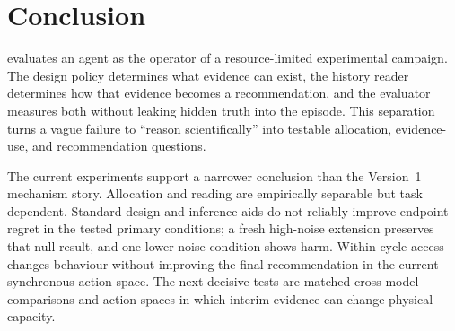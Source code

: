 \section{Conclusion}
\label{sec:conclusion}

\slowlab{} evaluates an agent as the operator of a resource-limited experimental campaign.
The design policy determines what evidence can exist, the history reader determines how that
evidence becomes a recommendation, and the evaluator measures both without leaking hidden
truth into the episode. This separation turns a vague failure to ``reason scientifically''
into testable allocation, evidence-use, and recommendation questions.

The current experiments support a narrower conclusion than the Version~1 mechanism story.
Allocation and reading are empirically separable but task dependent. Standard design and
inference aids do not reliably improve endpoint regret in the tested primary conditions; a
fresh high-noise extension preserves that null result, and one lower-noise condition shows
harm. Within-cycle access changes behaviour without improving the final recommendation in
the current synchronous action space. The next decisive tests are matched cross-model
comparisons and action spaces in which interim evidence can change physical capacity.
